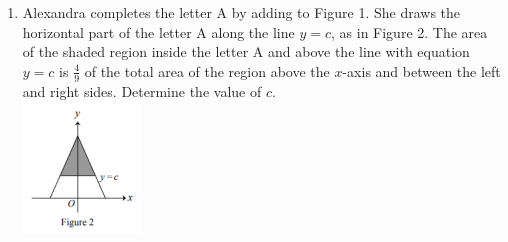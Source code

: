 \documentclass[12pt]{extarticle}
\begin{document}
\begin{enumerate}
{\begin{enumerate}
        \item {Alexandra completes the letter A by adding to Figure 1. She draws the horizontal part of the letter A along the line $y = c$, as in Figure 2. The area of the shaded region inside the letter A and above the line with equation $y = c$ is $\frac{4}{9}$ of the total area of the region above the $x$-axis and between the left and right sides. Determine the value of $c$.\\
        \includegraphics{CSMC2018_B1d.png}} %
    \end{enumerate}}
\end{enumerate}
\end{document}
